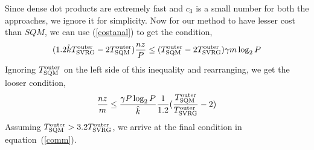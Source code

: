 Since dense dot products are extremely fast and $c_3$ is a small number for both the approaches, we ignore it for simplicity. Now for our method to have lesser cost than $SQM$, we can use (\ref{costanal}) to get the condition,
\begin{equation}
(1.2\hat{k}T^{\rm outer}_{\rm SVRG} - 2T^{\rm outer}_{\rm SQM})\frac{nz}{P}  \leq  (T^{\rm outer}_{\rm SQM} - 2 T^{\rm outer}_{\rm SVRG}) \gamma m \log_2 P
\end{equation}
Ignoring $T^{\rm outer}_{\rm SQM}$ on the left side of this inequality and rearranging, we get the looser condition,
\begin{equation}
\frac{nz}{m}  \leq  \frac{\gamma P\log_2 P}{\hat{k}} \frac{1}{1.2}(\frac{T^{\rm outer}_{\rm SQM}}{T^{\rm outer}_{\rm SVRG}} - 2 )
\end{equation}
Assuming $T^{\rm outer}_{\rm SQM} > 3.2T^{\rm outer}_{\rm SVRG}$, we arrive at the final condition in equation~(\ref{comm}). 
